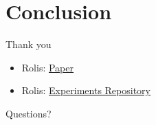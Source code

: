 \documentclass[xcolor=dvipsnames]{beamer}
\begin{document}
    \section{Conclusion}

    \begin{frame}{Thank you}

        \begin{itemize}
            \item Rolis: \href{https://dl.acm.org/doi/10.1145/3492321.3519561}{Paper}
            \item Rolis: \href{https://github.com/stonysystems/rolis}{Experiments Repository}
        \end{itemize}

        Questions? 

    \end{frame}
\end{document}
